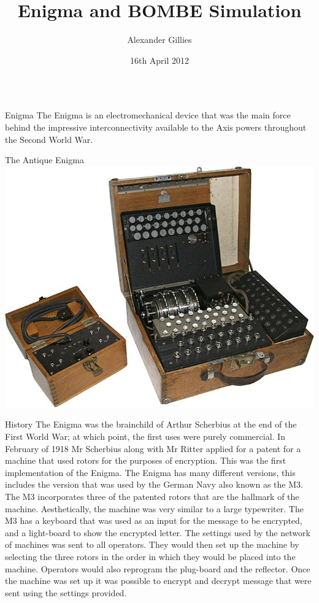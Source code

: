 \documentclass[final]{beamer}
\title[Final Year Project Poster]{Enigma and BOMBE Simulation}
\author[A L Gillies]{Alexander Gillies}
\institute[Durham]{School of Engineering and Computing Sciences, Durham University}
\date{16th April 2012}
\begin{document}
  \begin{frame}{} 

  \vfill
    \begin{columns}[t]
    
    
      \begin{column}{.32\linewidth}
      \centering
        \begin{block}{Enigma}
          The Enigma is an electromechanical device that was the main force behind the impressive interconnectivity available to the Axis powers throughout the Second World War.
        \end{block}
        
         \begin{block}{The Antique Enigma}
          \includegraphics[width=.5\columnwidth]{historicEnigma.png} 
        \end{block}
        
         \begin{block}{History} \small{
          The Enigma was the brainchild of  Arthur Scherbius at the end of the First World War; at which point, the first uses were purely commercial. In February of 1918 Mr Scherbius along with Mr Ritter applied for a patent for a machine that used rotors for the purposes of encryption. This was the first implementation of the Enigma. The Enigma has many different versions, this includes the version that was used by the German Navy also known as the M3. The M3 incorporates three of the patented rotors that are the hallmark of the machine. Aesthetically, the machine was very similar to a large typewriter. The M3 has a keyboard that was used as an input for the message to be encrypted, and a light-board to show the encrypted letter. The settings used by the network of machines was sent to all operators. They would then set up the machine by selecting the three rotors in the order in which they would be placed into the machine. Operators would also reprogram the plug-board and the reflector. Once the machine was set up it was possible to encrypt and decrypt message that were sent using the settings provided.}
        \end{block}
        

\end{column}
\end{columns}
\end{frame}
\end{document}
